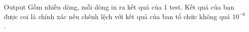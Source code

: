 Output
Gồm nhiều dòng, mỗi dòng in ra kết quả của 1 test. Kết quả của bạn được coi là chính xác nếu chênh lệch với kết quả của ban tổ chức không quá   \textbf{    $10^{-6}$}   .